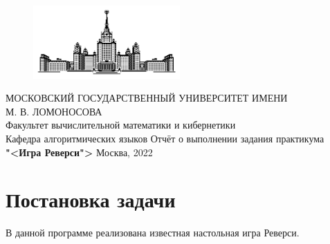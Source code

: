 \documentclass[oneside,final,14pt]{extreport}
\begin{document}
\begin{titlepage}
    \begin{figure}[h]
        \centering
        \includegraphics[width=0.5\textwidth]{logo}
    \end{figure}
    \vspace{-12mm}
    \begin{center}
        \small\textmd
        {
        МОСКОВСКИЙ ГОСУДАРСТВЕННЫЙ УНИВЕРСИТЕТ ИМЕНИ \\ М. В. ЛОМОНОСОВА \\
        Факультет вычислительной математики и кибернетики \\
        Кафедра алгоритмических языков
        }
        \vfill
        \LARGE Отчёт о выполнении задания практикума \\
        \vspace{5mm}
        \Huge\textbf{"<Игра Реверси">}
        \vfill
        \normalsize
        \vspace{-10mm}
        \vfill
        Москва, 2022
    \end{center}
    

\end{titlepage}

\setcounter{page}{2}

\section{Постановка задачи}
В данной программе реализована известная настольная игра Реверси. 
\end{document}
